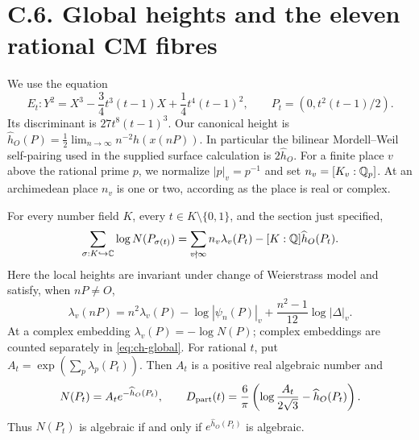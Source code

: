 \section{C.6. Global heights and the eleven rational CM fibres}

We use the equation
\[
 E_t:Y^2=X^3-\frac34t^3(t-1)X+\frac14t^4(t-1)^2,
 \qquad P_t=(0,t^2(t-1)/2).
\]
Its discriminant is $27t^8(t-1)^3$. Our canonical height is
$\widehat h_O(P)=\frac12\lim_{n\to\infty}n^{-2}h(x(nP))$.
In particular the bilinear Mordell--Weil self-pairing used in the
supplied surface calculation is $2\widehat h_O$.
For a finite place $v$ above the rational prime $p$, we normalize
$|p|_v=p^{-1}$ and set $n_v=[K_v:\mathbb Q_p]$. At an archimedean
place $n_v$ is one or two, according as the place is real or complex.

\begin{statement}
For every number field $K$, every $t\in K\setminus\{0,1\}$,
and the section just specified,
\begin{equation}\label{eq:ch-global}
 \sum_{\sigma:K\hookrightarrow\mathbb C}\log N(P_{\sigma(t)})
 =\sum_{v\nmid\infty}n_v\lambda_v(P_t)
          -[K:\mathbb Q]\widehat h_O(P_t).
\end{equation}
Here the local heights are invariant under change of Weierstrass
model and satisfy, when $nP\ne O$,
\begin{equation}\label{eq:ch-local-mult}
 \lambda_v(nP)=n^2\lambda_v(P)-\log|\psi_n(P)|_v
                   +\frac{n^2-1}{12}\log|\Delta|_v.
\end{equation}
At a complex embedding $\lambda_v(P)=-\log N(P)$; complex
embeddings are counted separately in \eqref{eq:ch-global}.
For rational $t$, put $A_t=\exp(\sum_p\lambda_p(P_t))$.
Then $A_t$ is a positive real algebraic number and
\[
 N(P_t)=A_t e^{-\widehat h_O(P_t)},\qquad
 D_{\rm part}(t)=\frac6\pi
       \left(\log\frac{A_t}{2\sqrt3}-\widehat h_O(P_t)\right).
\]
Thus $N(P_t)$ is algebraic if and only if
$e^{\widehat h_O(P_t)}$ is algebraic.
\end{statement}
